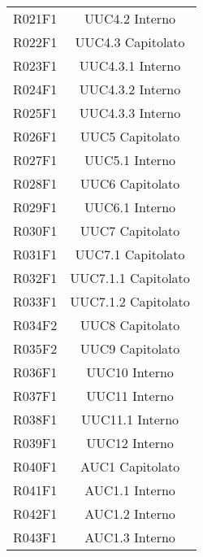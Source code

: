 \documentclass[../analisi-dei-requisiti.tex]{subfiles}
\begin{document}
\begin{longtable}[H]{c|c}
  R021F1                               & UUC4.2 Interno                \\
  R022F1                               & UUC4.3 Capitolato             \\
  R023F1                               & UUC4.3.1 Interno              \\
  R024F1                               & UUC4.3.2 Interno              \\
  R025F1                               & UUC4.3.3 Interno              \\
  R026F1                               & UUC5 Capitolato               \\
  R027F1                               & UUC5.1 Interno                \\
  R028F1                               & UUC6 Capitolato               \\
  R029F1                               & UUC6.1 Interno                \\
  R030F1                               & UUC7 Capitolato               \\
  R031F1                               & UUC7.1 Capitolato             \\
  R032F1                               & UUC7.1.1 Capitolato           \\
  R033F1                               & UUC7.1.2 Capitolato           \\
  R034F2                               & UUC8 Capitolato               \\
  R035F2                               & UUC9 Capitolato               \\
  R036F1                               & UUC10 Interno                 \\
  R037F1                               & UUC11 Interno                 \\
  R038F1                               & UUC11.1 Interno               \\
  R039F1                               & UUC12 Interno                 \\
  R040F1                               & AUC1 Capitolato               \\
  R041F1                               & AUC1.1 Interno                \\
  R042F1                               & AUC1.2 Interno                \\
  R043F1                               & AUC1.3 Interno                \\

\end{longtable}
\end{document}
